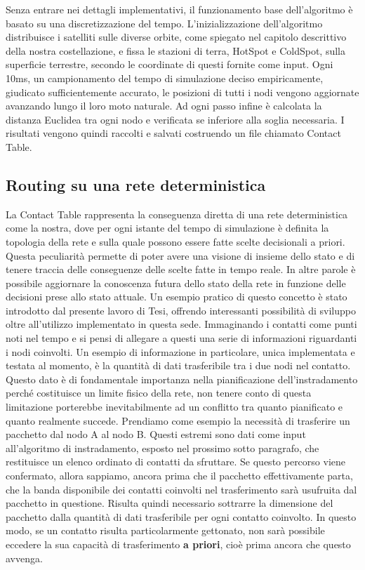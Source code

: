 \documentclass[a4paper]{article}
\begin{document}
		Senza entrare nei dettagli implementativi, il funzionamento base dell'algoritmo è basato su una discretizzazione del tempo. L'inizializzazione dell'algoritmo distribuisce i satelliti sulle diverse orbite, come spiegato nel capitolo descrittivo della nostra costellazione, e fissa le stazioni di terra, HotSpot e ColdSpot, sulla superficie terrestre, secondo le coordinate di questi fornite come input. Ogni 10ms, un campionamento del tempo di simulazione deciso empiricamente, giudicato sufficientemente accurato, le posizioni di tutti i nodi vengono aggiornate avanzando lungo il loro moto naturale. Ad ogni passo infine è calcolata la distanza Euclidea tra ogni nodo e verificata se inferiore alla soglia necessaria. I risultati vengono quindi raccolti e salvati costruendo un file chiamato Contact Table.
		
		
		
		
		\subsection{Routing su una rete deterministica}
		La Contact Table rappresenta la conseguenza diretta di una rete deterministica come la nostra, dove per ogni istante del tempo di simulazione è definita la topologia della rete e sulla quale possono essere fatte scelte decisionali a priori. Questa peculiarità permette di poter avere una visione di insieme dello stato e di tenere traccia delle conseguenze delle scelte fatte in tempo reale. In altre parole è possibile aggiornare la conoscenza futura dello stato della rete in funzione delle decisioni prese allo stato attuale. Un esempio pratico di questo concetto è stato introdotto dal presente lavoro di Tesi, offrendo interessanti possibilità di sviluppo oltre all'utilizzo implementato in questa sede. 
		Immaginando i contatti come punti noti nel tempo e si pensi di allegare a questi una serie di informazioni riguardanti i nodi coinvolti. Un esempio di informazione in particolare, unica implementata e testata al momento, è la quantità di dati trasferibile tra i due nodi nel contatto. Questo dato è di fondamentale importanza nella pianificazione dell'instradamento perché costituisce un limite fisico della rete, non tenere conto di questa limitazione porterebbe inevitabilmente ad un conflitto tra quanto pianificato e quanto realmente succede. 
		Prendiamo come esempio la necessità di trasferire un pacchetto dal nodo A al nodo B. Questi estremi sono dati come input all'algoritmo di instradamento, esposto nel prossimo sotto paragrafo, che restituisce un elenco ordinato di contatti da sfruttare. Se questo percorso viene confermato, allora sappiamo, ancora prima che il pacchetto effettivamente parta, che la banda disponibile dei contatti coinvolti nel trasferimento sarà usufruita dal pacchetto in questione. Risulta quindi necessario sottrarre la dimensione del pacchetto dalla quantità di dati trasferibile per ogni contatto coinvolto. In questo modo, se un contatto risulta particolarmente gettonato, non sarà possibile eccedere la sua capacità di trasferimento {\bf a priori}, cioè prima ancora che questo avvenga. 
		
\end{document}
